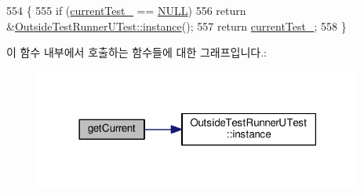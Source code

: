 \begin{DoxyCode}
554 \{
555     \textcolor{keywordflow}{if} (\hyperlink{class_utest_shell_ad94b32e8c3c62bf08ca0a2f74a3cf563}{currentTest\_} == \hyperlink{openavb__types__base__pub_8h_a070d2ce7b6bb7e5c05602aa8c308d0c4}{NULL})
556         \textcolor{keywordflow}{return} &\hyperlink{class_outside_test_runner_u_test_a8dad585c4cd735968e602253e92c4866}{OutsideTestRunnerUTest::instance}();
557     \textcolor{keywordflow}{return} \hyperlink{class_utest_shell_ad94b32e8c3c62bf08ca0a2f74a3cf563}{currentTest\_};
558 \}
\end{DoxyCode}


이 함수 내부에서 호출하는 함수들에 대한 그래프입니다.\+:
\nopagebreak
\begin{figure}[H]
\begin{center}
\leavevmode
\includegraphics[width=306pt]{class_utest_shell_afeb97f1f06324a42444c71b412655122_cgraph}
\end{center}
\end{figure}




